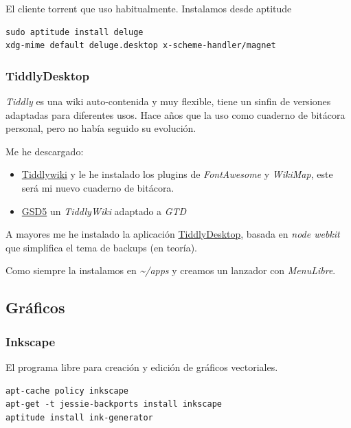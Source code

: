 \documentclass[12pt,spanish,]{scrartcl}
\providecommand{\tightlist}{%
  \setlength{\itemsep}{0pt}\setlength{\parskip}{0pt}}
\begin{document}
El cliente torrent que uso habitualmente. Instalamos desde aptitude

\begin{verbatim}
sudo aptitude install deluge
xdg-mime default deluge.desktop x-scheme-handler/magnet
\end{verbatim}

\subsubsection{TiddlyDesktop}\label{tiddlydesktop}

\emph{Tiddly} es una wiki auto-contenida y muy flexible, tiene un sinfin
de versiones adaptadas para diferentes usos. Hace años que la uso como
cuaderno de bitácora personal, pero no había seguido su evolución.

Me he descargado:

\begin{itemize}
\tightlist
\item
  \href{http://tiddlywiki.com/}{Tiddlywiki} y le he instalado los
  plugins de \emph{FontAwesome} y \emph{WikiMap}, este será mi nuevo
  cuaderno de bitácora.
\item
  \href{http://gsd5.tiddlyspot.com/}{GSD5} un \emph{TiddlyWiki} adaptado
  a \emph{GTD}
\end{itemize}

A mayores me he instalado la aplicación
\href{https://github.com/Jermolene/TiddlyDesktop}{TiddlyDesktop}, basada
en \emph{node webkit} que simplifica el tema de backups (en teoría).

Como siempre la instalamos en \emph{\textasciitilde{}/apps} y creamos un
lanzador con \emph{MenuLibre}.

\subsection{Gráficos}\label{gruxe1ficos}

\subsubsection{Inkscape}\label{inkscape}

El programa libre para creación y edición de gráficos vectoriales.

\begin{verbatim}
apt-cache policy inkscape
apt-get -t jessie-backports install inkscape
aptitude install ink-generator
\end{verbatim}
\end{document}
